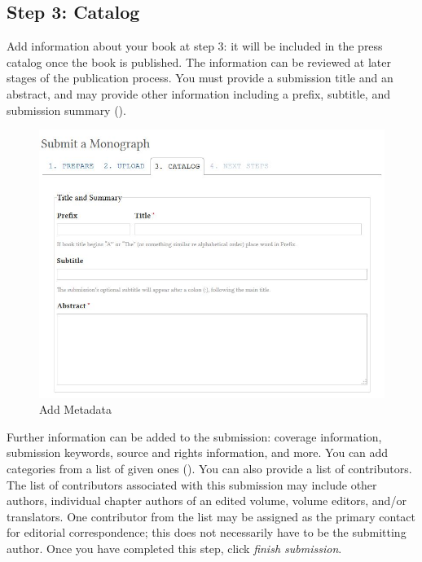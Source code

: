 
%

\subsection*{Step 3: Catalog}

Add information about your book at step 3: it will be included in the press catalog once the book is published. The information can be reviewed at later stages of the publication process. You must provide a submission title and an abstract, and may provide other information including a prefix, subtitle, and submission summary ().

\begin{figure}[h] \centering 
\includegraphics[width=1\textwidth]{./img/submission-6.jpg} \caption{Add Metadata}
\label{fig:submission6}

\end{figure}

Further information can be added to the submission: coverage information, submission keywords, source and rights information, and more. You can add categories from a list of given ones (). You can also provide a list of contributors. The list of contributors associated with this submission may include other authors, individual chapter authors of an edited volume, volume editors, and/or translators. One contributor from the list may be assigned as the primary contact for editorial correspondence; this does not necessarily have to be the submitting author. Once you have completed this step, click \textit{finish submission}.

